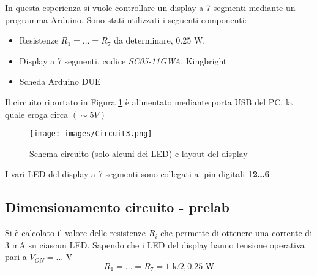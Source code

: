 In questa esperienza si vuole controllare un display a 7 segmenti mediante un programma Arduino. Sono stati utilizzati i seguenti componenti:
\begin{itemize}
    \item Resistenze $R_1=\dots=R_7$ da determinare, 0.25 W.
    \item Display a 7 segmenti,  codice \textit{SC05-11GWA}, Kingbright 
    \item Scheda Arduino DUE
\end{itemize}
Il circuito riportato in Figura \ref{fig:Circuit3} è alimentato mediante porta USB del PC, la quale eroga circa $(\sim 5 V)$
\begin{figure}[H]
    \centering
    \texttt{[image: images/Circuit3.png]}
    \caption{Schema circuito (solo alcuni dei LED) e layout del display}
    \label{fig:Circuit3}
\end{figure}
I vari LED del display a 7 segmenti sono collegati ai pin digitali \textbf{12\dots6}
\subsection{Dimensionamento circuito - prelab}
Si è calcolato il valore delle resistenze $R_i$ che permette di ottenere una corrente di 3 mA su ciascun LED. Sapendo che i LED del display hanno tensione operativa pari a $V_{ON}=...\text{ V}$
\begin{equation*}
    R_1=\dots=R_7=1\text{ k}\Omega, 0.25\text{ W}
\end{equation*}
\clearpage
